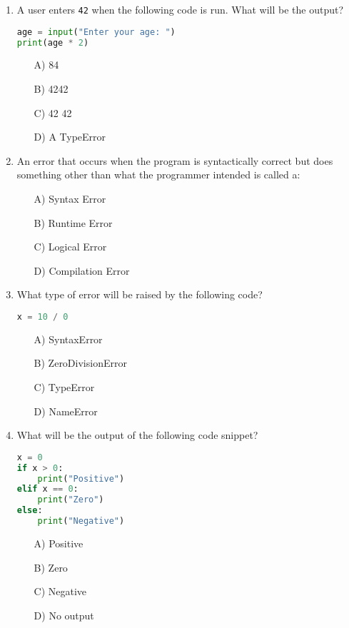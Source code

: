 \documentclass[9pt]{article}
\begin{document}
\begin{multicols}{2}
\begin{enumerate}
\item A user enters \texttt{42} when the following code is run. What will be the output?
\begin{lstlisting}[language=Python]
age = input("Enter your age: ")
print(age * 2)
\end{lstlisting}
\begin{enumerate}
\item[A)] 84
\item[B)] 4242
\item[C)] 42 42
\item[D)] A TypeError
\end{enumerate}

\item An error that occurs when the program is syntactically correct but does something other than what the programmer intended is called a:
\begin{enumerate}
    \item[A)] Syntax Error
    \item[B)] Runtime Error
    \item[C)] Logical Error
    \item[D)] Compilation Error
\end{enumerate}

\item What type of error will be raised by the following code?
\begin{lstlisting}[language=Python]
x = 10 / 0
\end{lstlisting}
\begin{enumerate}
\item[A)] SyntaxError
\item[B)] ZeroDivisionError
\item[C)] TypeError
\item[D)] NameError
\end{enumerate}

\item What will be the output of the following code snippet?
\begin{lstlisting}[language=Python]
x = 0
if x > 0:
    print("Positive")
elif x == 0:
    print("Zero")
else:
    print("Negative")
\end{lstlisting}
\begin{enumerate}
\item[A)] Positive
\item[B)] Zero
\item[C)] Negative
\item[D)] No output
\end{enumerate}


\end{enumerate}
\end{multicols}
\end{document}
